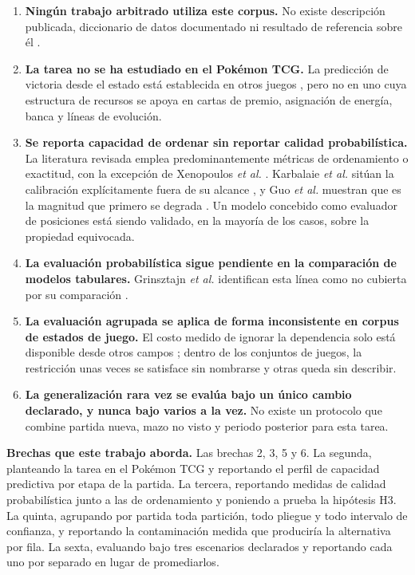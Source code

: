 \begin{enumerate}
  \item \textbf{Ningún trabajo arbitrado utiliza este corpus.} No existe
        descripción publicada, diccionario de datos documentado ni resultado
        de referencia sobre él \cite{ptcg_dataset_2026}.
  \item \textbf{La tarea no se ha estudiado en el Pok\'emon TCG.} La
        predicción de victoria desde el estado está establecida en otros
        juegos \cite{janusz_hearthstone_2017,bialecki_sc2egset_2023}, pero
        no en uno cuya estructura de recursos se apoya en cartas de premio,
        asignación de energía, banca y líneas de evolución.
  \item \textbf{Se reporta capacidad de ordenar sin reportar calidad
        probabilística.} La literatura revisada emplea predominantemente
        métricas de ordenamiento o exactitud, con la excepción de Xenopoulos
        \textit{et al.} \cite{xenopoulos_winprob_2022}. Karbalaie \textit{et
        al.} sitúan la calibración explícitamente fuera de su alcance
        \cite{karbalaie_participantaware_2026}, y Guo \textit{et al.}
        muestran que es la magnitud que primero se degrada
        \cite{guo_temporalshift_2021}. Un modelo concebido como evaluador de
        posiciones está siendo validado, en la mayoría de los casos, sobre
        la propiedad equivocada.
  \item \textbf{La evaluación probabilística sigue pendiente en la
        comparación de modelos tabulares.} Grinsztajn \textit{et al.}
        identifican esta línea como no cubierta por su comparación
        \cite{grinsztajn_trees_2022}.
  \item \textbf{La evaluación agrupada se aplica de forma inconsistente en
        corpus de estados de juego.} El costo medido de ignorar la
        dependencia solo está disponible desde otros campos
        \cite{karbalaie_participantaware_2026,sasse_leakage_2025,figueiredo_leakage_2024};
        dentro de los conjuntos de juegos, la restricción unas veces se
        satisface sin nombrarse y otras queda sin describir.
  \item \textbf{La generalización rara vez se evalúa bajo un único cambio
        declarado, y nunca bajo varios a la vez.} No existe un protocolo que
        combine partida nueva, mazo no visto y periodo posterior para esta
        tarea.
\end{enumerate}

\noindent\textbf{Brechas que este trabajo aborda.} Las brechas 2, 3, 5 y 6.
La segunda, planteando la tarea en el Pok\'emon TCG y reportando el perfil
de capacidad predictiva por etapa de la partida. La tercera, reportando
medidas de calidad probabilística junto a las de ordenamiento y poniendo a
prueba la hipótesis H3. La quinta, agrupando por partida toda partición,
todo pliegue y todo intervalo de confianza, y reportando la contaminación
medida que produciría la alternativa por fila. La sexta, evaluando bajo tres
escenarios declarados y reportando cada uno por separado en lugar de
promediarlos.

